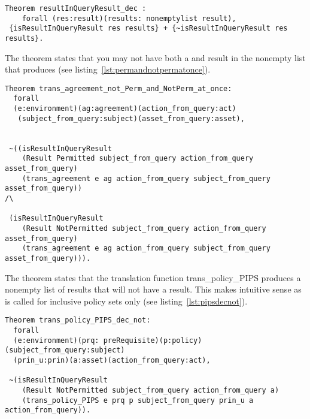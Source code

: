 \begin{lstlisting}
Theorem resultInQueryResult_dec :
    forall (res:result)(results: nonemptylist result), 
 {isResultInQueryResult res results} + {~isResultInQueryResult res results}.
\end{lstlisting}

The theorem  states that you may not have both a  and  result in the nonempty list that  produces (see listing~\ref{lst:permandnotpermatonce}).

\begin{lstlisting}
Theorem trans_agreement_not_Perm_and_NotPerm_at_once:
  forall
  (e:environment)(ag:agreement)(action_from_query:act)
   (subject_from_query:subject)(asset_from_query:asset),


 ~((isResultInQueryResult 
    (Result Permitted subject_from_query action_from_query asset_from_query)
    (trans_agreement e ag action_from_query subject_from_query asset_from_query)) 
/\

 (isResultInQueryResult 
    (Result NotPermitted subject_from_query action_from_query asset_from_query)
    (trans_agreement e ag action_from_query subject_from_query asset_from_query))).

\end{lstlisting}

The theorem  states that the translation function trans_policy_PIPS produces a nonempty list of results that will not have a  result. This makes intuitive sense as  is called for inclusive policy sets only (see listing~\ref{lst:pipsdecnot}).
\begin{lstlisting}
Theorem trans_policy_PIPS_dec_not:
  forall
  (e:environment)(prq: preRequisite)(p:policy)(subject_from_query:subject)
  (prin_u:prin)(a:asset)(action_from_query:act),

 ~(isResultInQueryResult 
    (Result NotPermitted subject_from_query action_from_query a)
    (trans_policy_PIPS e prq p subject_from_query prin_u a action_from_query)).

\end{lstlisting}

